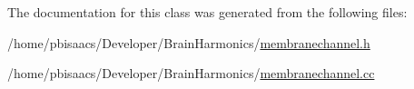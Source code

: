 The documentation for this class was generated from the following files\+:\begin{DoxyCompactItemize}
\item 
/home/pbisaacs/\+Developer/\+Brain\+Harmonics/\mbox{\hyperlink{membranechannel_8h}{membranechannel.\+h}}\item 
/home/pbisaacs/\+Developer/\+Brain\+Harmonics/\mbox{\hyperlink{membranechannel_8cc}{membranechannel.\+cc}}\end{DoxyCompactItemize}
